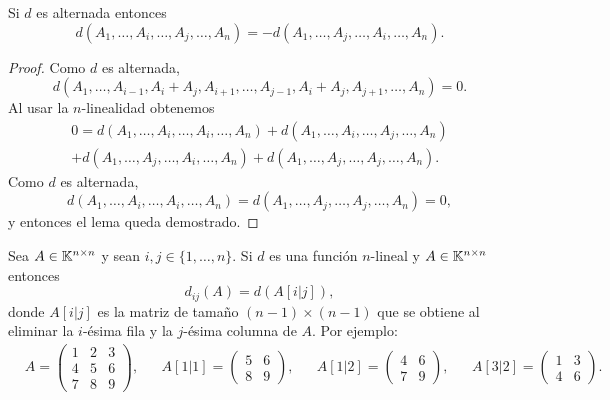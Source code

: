 \begin{lem}
    \label{lem:alternada}
    Si $d$ es alternada entonces 
    \[
        d(A_1,\dots,A_i,\dots,A_j,\dots,A_n)=-d(A_1,\dots,A_j,\dots,A_i,\dots,A_n).
    \]

	\begin{proof}
		Como $d$ es alternada,
		\[
		d(A_1,\dots,A_{i-1},A_i+A_j,A_{i+1},\dots,A_{j-1},A_i+A_j,A_{j+1},\dots,A_{n})=0.
		\]
		Al usar la $n$-linealidad obtenemos
		\begin{multline*}
			0=d(A_1,\dots,A_i,\dots,A_i,\dots,A_n)+d(A_1,\dots,A_i,\dots,A_j,\dots,A_n)\\
			+d(A_1,\dots,A_j,\dots,A_i,\dots,A_n)+d(A_1,\dots,A_j,\dots,A_j,\dots,A_n).
		\end{multline*}
		Como $d$ es alternada, 
		\[
		d(A_1,\dots,A_i,\dots,A_i,\dots,A_{n})=d(A_1,\dots,A_j,\dots,A_j,\dots,A_n)=0,
		\]
		y entonces el lema queda demostrado.
	\end{proof}
\end{lem}

\begin{block}
	Sea $A\in\mathbb{K}^{n\times n}$ y sean $i,j\in\{1,\dots,n\}$. Si $d$ es una
	función $n$-lineal y $A\in\mathbb{K}^{n\times n}$ entonces
	\[
		d_{ij}(A)=d(A[i|j]),
	\]
	donde $A[i|j]$ es la matriz de tamaño $(n-1)\times(n-1)$ que se obtiene al
	eliminar la $i$-ésima fila y la $j$-ésima columna de $A$. Por ejemplo:
	\begin{align*}
		&
		A=\begin{pmatrix}
			1 & 2 & 3\\
			4 & 5 & 6\\
			7 & 8 & 9
		\end{pmatrix},
		&&
		A[1|1]=\begin{pmatrix}
			5 & 6\\
			8 & 9
		\end{pmatrix},
		&&
		A[1|2]=\begin{pmatrix}
			4 & 6\\
			7 & 9
		\end{pmatrix},
		&&
		A[3|2]=\begin{pmatrix}
			1 & 3\\
			4 & 6
		\end{pmatrix}.
	\end{align*}
\end{block}

